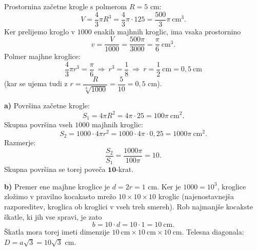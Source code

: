 \documentclass[a4paper,12pt]{letter}
\begin{document}
\begin{resitev}
Prostornina za\v{c}etne krogle s polmerom $R=5$ cm:
\[
V=\frac43\pi R^3=\frac43\pi\cdot125=\frac{500}{3}\pi\ \text{cm}^3.
\]
Ker prelijemo kroglo v $1000$ enakih majhnih kroglic, ima vsaka prostornino
\[
v=\frac{V}{1000}=\frac{500\pi}{3000}=\frac{\pi}{6}\ \text{cm}^3.
\]
Polmer majhne kroglice:
\[
\frac43\pi r^3=\frac{\pi}{6}\ \Rightarrow\ r^3=\frac18\ \Rightarrow\ r=\frac12\ \text{cm}=0{,}5\ \text{cm}
\]
(kar se ujema tudi z $r=\dfrac{R}{\sqrt[3]{1000}}=\dfrac{5}{10}=0{,}5$ cm).

\textbf{a)} Povr\v{s}ina za\v{c}etne krogle:
\[
S_1=4\pi R^2=4\pi\cdot25=100\pi\ \text{cm}^2.
\]
Skupna povr\v{s}ina vseh $1000$ majhnih kroglic:
\[
S_2=1000\cdot4\pi r^2=1000\cdot4\pi\cdot0{,}25=1000\pi\ \text{cm}^2.
\]
Razmerje:
\[
\frac{S_2}{S_1}=\frac{1000\pi}{100\pi}=10.
\]
Skupna povr\v{s}ina se torej pove\v{c}a $\boldsymbol{10}$-krat.

\textbf{b)} Premer ene majhne kroglice je $d=2r=1$ cm. Ker je $1000=10^3$, kroglice zlo\v{z}imo v pravilno kocakasto mre\v{z}o $10\times10\times10$ kroglic (najenostavnej\v{s}a razporeditev, kroglica ob kroglici v vseh treh smereh). Rob najmanj\v{s}e kocakste \v{s}katle, ki jih vse spravi, je zato
\[
b=10\cdot d=10\cdot1=10\ \text{cm}.
\]
\v{S}katla mora torej imeti dimenzije $10\ \text{cm}\times10\ \text{cm}\times10\ \text{cm}$. Telesna diagonala: $D=a\sqrt{3}=10\sqrt{3}$ cm.
\end{resitev}
\end{document}

